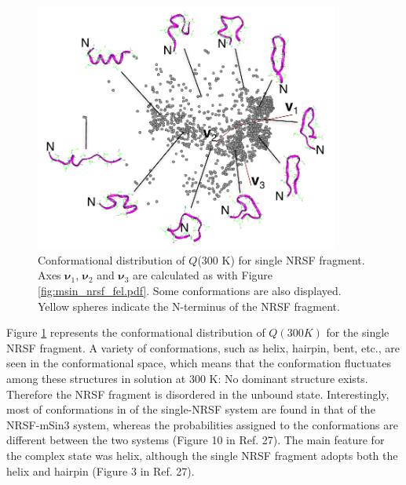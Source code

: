 \begin{figure}
  \centering
  \includegraphics[width=10cm]{../enhance_rev/figures/msin3_fel.pdf}
  \caption{\label{fig:msin3_fel.pdf} Conformational distribution of $Q$(300 K) for single NRSF fragment. Axes $\bm{\nu}_1$, $\bm{\nu}_2$ and $\bm{\nu}_3$ are calculated as with Figure \ref{fig:msin_nrsf_fel.pdf}. Some conformations are also displayed. Yellow spheres indicate the N-terminus of the NRSF fragment.}
\end{figure}
Figure \ref{fig:msin3_fel.pdf} represents the conformational distribution of $Q(300 K)$ for the single NRSF fragment. A variety of conformations, such as helix, hairpin, bent, etc., are seen in the conformational space, which means that the conformation fluctuates among these structures in solution at 300 K: No dominant structure exists. Therefore the NRSF fragment is disordered in the unbound state. Interestingly, most of conformations in  of the single-NRSF system are found in that of the NRSF-mSin3 system, whereas the probabilities assigned to the conformations are different between the two systems (Figure 10 in Ref. 27). The main feature for the complex state was helix, although the single NRSF fragment adopts both the helix and hairpin (Figure 3 in Ref. 27).

